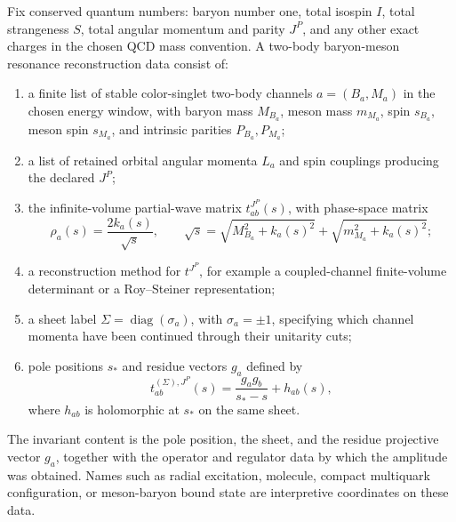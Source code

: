 \begin{definition}
\label{def:qcd-baryon-meson-resonance-data}
Fix conserved quantum numbers: baryon number one, total isospin \(I\), total
strangeness \(S\), total angular momentum and parity \(J^P\), and any other
exact charges in the chosen QCD mass convention.  A two-body baryon-meson
resonance reconstruction data consist of:
\begin{enumerate}
  \item a finite list of stable color-singlet two-body channels
  \(a=(B_a,M_a)\) in the chosen energy window, with baryon mass \(M_{B_a}\),
  meson mass \(m_{M_a}\), spin \(s_{B_a}\), meson spin \(s_{M_a}\), and
  intrinsic parities \(P_{B_a},P_{M_a}\);
  \item a list of retained orbital angular momenta \(L_a\) and spin couplings
  producing the declared \(J^P\);
  \item the infinite-volume partial-wave matrix \(t_{ab}^{J^P}(s)\), with
  phase-space matrix
  \[
    \rho_a(s)=
    \frac{2k_a(s)}{\sqrt s},
    \qquad
    \sqrt s=
    \sqrt{M_{B_a}^2+k_a(s)^2}
    +
    \sqrt{m_{M_a}^2+k_a(s)^2};
  \]
  \item a reconstruction method for \(t^{J^P}\), for example a
  coupled-channel finite-volume determinant or a Roy--Steiner representation;
  \item a sheet label \(\Sigma=\operatorname{diag}(\sigma_a)\), with
  \(\sigma_a=\pm1\), specifying which channel momenta have been continued
  through their unitarity cuts;
  \item pole positions \(s_\ast\) and residue vectors \(g_a\) defined by
  \begin{equation}
    t_{ab}^{(\Sigma),J^P}(s)
    =
    \frac{g_a g_b}{s_\ast-s}
    +h_{ab}(s),
    \label{eq:qcd-baryon-resonance-residue-vector}
  \end{equation}
  where \(h_{ab}\) is holomorphic at \(s_\ast\) on the same sheet.
\end{enumerate}
The invariant content is the pole position, the sheet, and the residue
projective vector \(g_a\), together with the operator and regulator data by
which the amplitude was obtained.  Names such as radial excitation,
molecule, compact multiquark configuration, or meson-baryon bound state are
interpretive coordinates on these data.
\end{definition}

